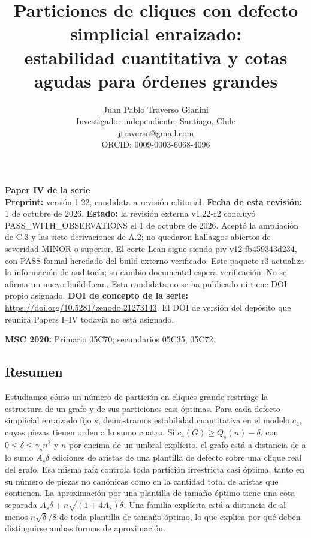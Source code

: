 \documentclass[spanish,11pt,a4paper]{article}
\title{Particiones de cliques con defecto simplicial enraizado:\\estabilidad cuantitativa y cotas agudas para órdenes grandes}
\author{Juan Pablo Traverso Gianini\\
\small Investigador independiente, Santiago, Chile\\
\small \href{mailto:jtraverso@gmail.com}{jtraverso@gmail.com}\\
\small ORCID: 0009-0003-6068-4096}
\date{}
\begin{document}
\raggedbottom
\maketitle
\textbf{Paper IV de la serie}\\
\textbf{Preprint:} versión 1.22, candidata a revisión editorial. \textbf{Fecha de esta revisión:} 1 de octubre de 2026. \textbf{Estado:} la revisión externa v1.22-r2 concluyó {\ttfamily\small PASS\_\discretionary{\hbox{\ensuremath{\hookrightarrow}}}{}{}WITH\_\discretionary{\hbox{\ensuremath{\hookrightarrow}}}{}{}OBSERVATIONS} el 1 de octubre de 2026. Aceptó la ampliación de C.3 y las siete derivaciones de A.2; no quedaron hallazgos abiertos de severidad MINOR o superior. El corte Lean sigue siendo {\ttfamily\small piv-\discretionary{\hbox{\ensuremath{\hookrightarrow}}}{}{}v12-\discretionary{\hbox{\ensuremath{\hookrightarrow}}}{}{}fb459343d234}, con PASS formal heredado del build externo verificado. Este paquete r3 actualiza la información de auditoría; su cambio documental espera verificación. No se afirma un nuevo build Lean. Esta candidata no se ha publicado ni tiene DOI propio asignado. \textbf{DOI de concepto de la serie:} \url{https://doi.org/10.5281/zenodo.21273143}. El DOI de versión del depósito que reunirá Papers I--IV todavía no está asignado.

\textbf{MSC 2020:} Primario 05C70; secundarios 05C35, 05C72.

\subsection{Resumen}\label{resumen}

Estudiamos cómo un número de partición en cliques grande restringe la estructura de un grafo y de sus particiones casi óptimas. Para cada defecto simplicial enraizado fijo \(s\), demostramos estabilidad cuantitativa en el modelo \(c_4\), cuyas piezas tienen orden a lo sumo cuatro. Si \(c_4(G)\ge Q_s(n)-\delta\), con \(0\le\delta\le\gamma_s n^2\) y \(n\) por encima de un umbral explícito, el grafo está a distancia de a lo sumo \(A_s\delta\) ediciones de aristas de una plantilla de defecto sobre una clique real del grafo. Esa misma raíz controla toda partición irrestricta casi óptima, tanto en su número de piezas no canónicas como en la cantidad total de aristas que contienen. La aproximación por una plantilla de tamaño óptimo tiene una cota separada \(A_s\delta+n\sqrt{(1+4A_s)\delta}\). Una familia explícita está a distancia de al menos \(n\sqrt{\delta}/8\) de toda plantilla de tamaño óptimo, lo que explica por qué deben distinguirse ambas formas de aproximación.
\end{document}

